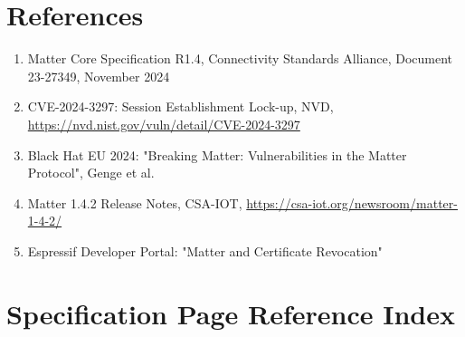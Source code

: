 \documentclass[11pt,a4paper]{article}
\begin{document}
\begin{center}
\end{center}

\section{References}

\begin{enumerate}
    \item Matter Core Specification R1.4, Connectivity Standards Alliance, Document 23-27349, November 2024
    \item CVE-2024-3297: Session Establishment Lock-up, NVD, \url{https://nvd.nist.gov/vuln/detail/CVE-2024-3297}
    \item Black Hat EU 2024: "Breaking Matter: Vulnerabilities in the Matter Protocol", Genge et al.
    \item Matter 1.4.2 Release Notes, CSA-IOT, \url{https://csa-iot.org/newsroom/matter-1-4-2/}
    \item Espressif Developer Portal: "Matter and Certificate Revocation"
\end{enumerate}

\appendix

\section{Specification Page Reference Index}
\end{document}
